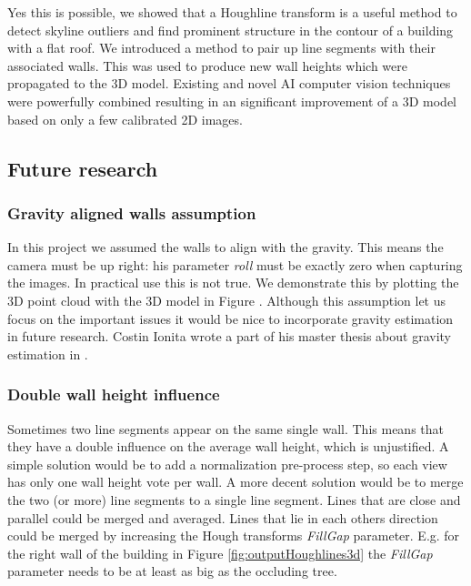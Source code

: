 Yes this is possible, we showed that a Houghline transform is a useful method to detect
skyline outliers and find prominent structure in the contour of a building with a flat
roof. We introduced a method to pair up line segments with their associated
walls. This was used to produce new wall heights which were propagated to the 3D
model.  Existing and novel AI computer vision techniques were powerfully
combined resulting in an significant improvement of a 3D model based on only a
few calibrated 2D images. 

\subsection{Future research}
\subsubsection{Gravity aligned walls assumption}
In this project we assumed the walls to align with the gravity.
This means the camera must be up right: his parameter \emph{roll} must be
exactly zero when capturing the images. 
In practical use this is not true. We demonstrate this by plotting the 3D point cloud
with the 3D model in Figure .
Although this assumption let us focus on the important issues it would be nice
to incorporate gravity estimation in future research.
Costin Ionita wrote a part of his master thesis about gravity estimation in
\cite{costin}.\\

\subsubsection{Double wall height influence}
Sometimes two line segments appear on the same single wall. This means that they have a double
influence on the average wall height, which is unjustified. 
A simple solution would be to add a normalization pre-process step, so each view
has only one wall height vote per wall. A more decent solution would be to
merge the two (or more) line segments to a single line segment. 
Lines that are close and parallel could be merged and averaged.
Lines that lie in each others direction could be merged by increasing the 
Hough transforms \emph{FillGap} parameter.  E.g. for the right wall of the building in 
Figure \ref{fig:outputHoughlines3d} the \emph{FillGap} parameter needs to be at
least as big as the occluding tree.


